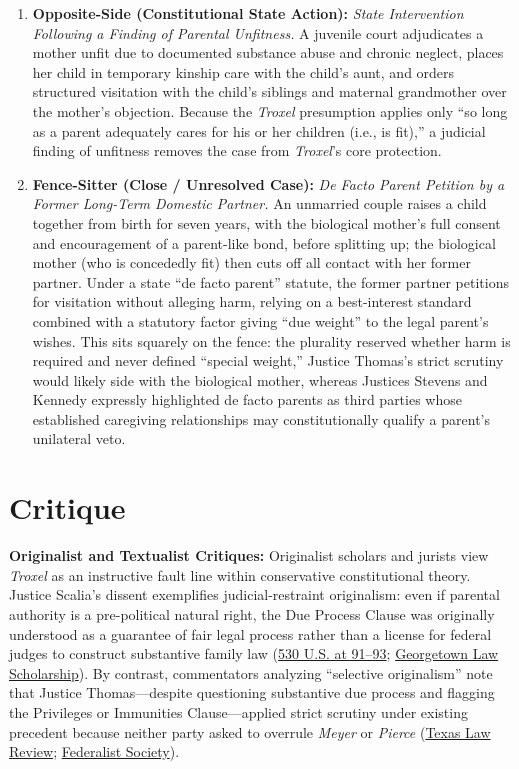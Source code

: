 \documentclass[12pt]{article}
\begin{document}
\begin{enumerate}
\item \textbf{Opposite-Side (Constitutional State Action):} \textit{State Intervention Following a Finding of Parental Unfitness.} A juvenile court adjudicates a mother unfit due to documented substance abuse and chronic neglect, places her child in temporary kinship care with the child's aunt, and orders structured visitation with the child's siblings and maternal grandmother over the mother's objection. Because the \textit{Troxel} presumption applies only ``so long as a parent adequately cares for his or her children (i.e., is fit),'' a judicial finding of unfitness removes the case from \textit{Troxel}'s core protection.
\item \textbf{Fence-Sitter (Close / Unresolved Case):} \textit{De Facto Parent Petition by a Former Long-Term Domestic Partner.} An unmarried couple raises a child together from birth for seven years, with the biological mother's full consent and encouragement of a parent-like bond, before splitting up; the biological mother (who is concededly fit) then cuts off all contact with her former partner. Under a state ``de facto parent'' statute, the former partner petitions for visitation without alleging harm, relying on a best-interest standard combined with a statutory factor giving ``due weight'' to the legal parent's wishes. This sits squarely on the fence: the plurality reserved whether harm is required and never defined ``special weight,'' Justice Thomas's strict scrutiny would likely side with the biological mother, whereas Justices Stevens and Kennedy expressly highlighted de facto parents as third parties whose established caregiving relationships may constitutionally qualify a parent's unilateral veto.
\end{enumerate}

\section{Critique}
\textbf{Originalist and Textualist Critiques:} Originalist scholars and jurists view \textit{Troxel} as an instructive fault line within conservative constitutional theory. Justice Scalia's dissent exemplifies judicial-restraint originalism: even if parental authority is a pre-political natural right, the Due Process Clause was originally understood as a guarantee of fair legal process rather than a license for federal judges to construct substantive family law (\href{https://www.law.cornell.edu/supremecourt/text/99-138}{530 U.S. at 91--93}; \href{https://scholarship.law.georgetown.edu/context/facpub/article/3587/viewcontent/An_Originalist_Theory_of_Due_Process_of_Law.pdf}{Georgetown Law Scholarship}). By contrast, commentators analyzing ``selective originalism'' note that Justice Thomas---despite questioning substantive due process and flagging the Privileges or Immunities Clause---applied strict scrutiny under existing precedent because neither party asked to overrule \textit{Meyer} or \textit{Pierce} (\href{https://texaslawreview.org/selective-originalism-and-judicial-role-morality/}{Texas Law Review}; \href{https://fedsoc.org/case/troxel-v-granville}{Federalist Society}).
\end{document}
